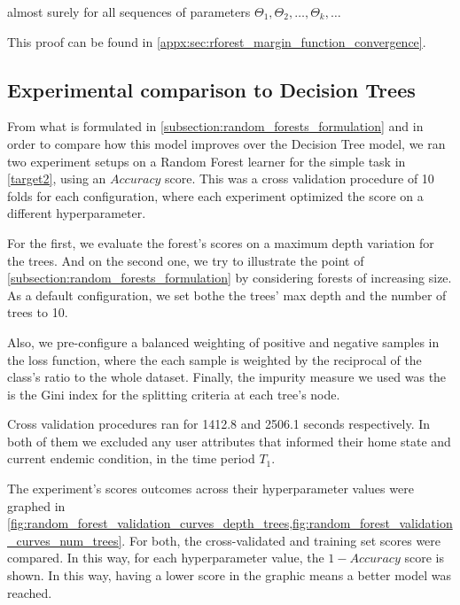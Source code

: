 almost surely for all sequences of parameters $\Theta_1,\Theta_2, \ldots, \Theta_k,\ldots$

This proof can be found in \cref{appx:sec:rforest_margin_function_convergence}.


\subsection{ Experimental comparison to Decision Trees}\label{subsection:random_forests_comparison_trees}

From what is formulated in \cref{subsection:random_forests_formulation} and in order to compare how this model improves over the Decision Tree model, we ran two experiment setups on a Random Forest learner for the simple task in \cref{target2}, using an $Accuracy$ score.
This was a cross validation procedure of 10 folds for each configuration, where each experiment optimized the score on a different hyperparameter.

For the first, we evaluate the forest's scores on a maximum depth variation for the trees.
And on the second one, we try to illustrate the point of \cref{subsection:random_forests_formulation} by considering forests of increasing size.
As a default configuration, we set bothe the trees' max depth and the number of trees to 10.

Also, we pre-configure a balanced weighting of positive and negative samples in the loss function, where the each sample is weighted by the reciprocal of the class's ratio to the whole dataset.
Finally, the impurity measure  we used was the is the Gini index for the splitting criteria at each tree's node.

Cross validation procedures ran for 1412.8 and 2506.1 seconds respectively. In both of them we excluded any user attributes that informed their home state and current endemic condition, in the time period $T_1$.

The experiment's scores outcomes across their hyperparameter values were graphed in \cref{fig:random_forest_validation_curves_depth_trees,fig:random_forest_validation_curves_num_trees}.
For both, the cross-validated and training set scores were compared. In this way, for each hyperparameter value, the $1-Accuracy$ score is shown.
In this way, having a lower score in the graphic means a better model was reached.


